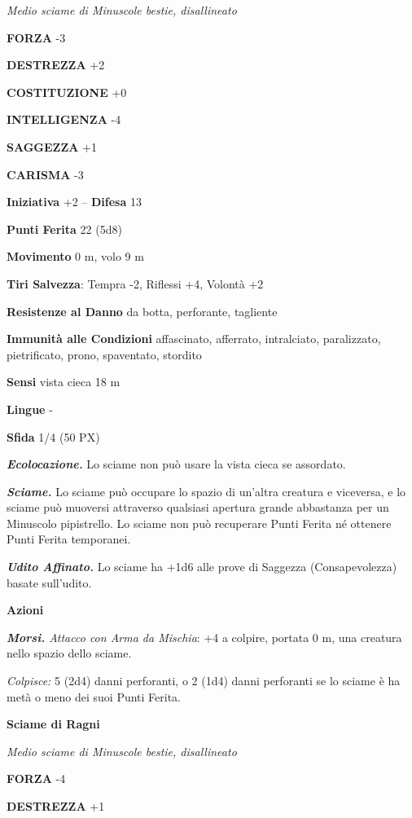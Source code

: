\begin{multicols}{2}
	\textit{Medio sciame di Minuscole bestie, disallineato}

	\textbf{FORZA} -3

	\textbf{DESTREZZA} +2

	\textbf{COSTITUZIONE} +0

	\textbf{INTELLIGENZA} -4

	\textbf{SAGGEZZA} +1

	\textbf{CARISMA} -3

	\textbf{Iniziativa} +2 -- \textbf{Difesa} 13

	\textbf{Punti Ferita} 22 (5d8)

	\textbf{Movimento} 0 m, volo 9 m

	\textbf{Tiri Salvezza}: Tempra -2, Riflessi +4, Volontà +2

	\textbf{Resistenze al Danno} da botta, perforante, tagliente

	\textbf{Immunità alle Condizioni} affascinato, afferrato, intralciato, paralizzato, pietrificato, prono, spaventato, stordito

	\textbf{Sensi} vista cieca 18 m

	\textbf{Lingue} -

	\textbf{Sfida} 1/4 (50 PX)

	\textit{\textbf{Ecolocazione.}} Lo sciame non può usare la vista cieca se assordato.

	\textit{\textbf{Sciame.}} Lo sciame può occupare lo spazio di un'altra creatura e viceversa, e lo sciame può muoversi attraverso qualsiasi apertura grande abbastanza per un Minuscolo pipistrello. Lo sciame non può recuperare Punti Ferita né ottenere Punti Ferita temporanei.

	\textit{\textbf{Udito Affinato.}} Lo sciame ha +1d6 alle prove di Saggezza (Consapevolezza) basate sull'udito.

	\textbf{Azioni}

	\textit{\textbf{Morsi.} Attacco con Arma da Mischia}: +4 a colpire, portata 0 m, una creatura nello spazio dello sciame.

	\textit{Colpisce:} 5 (2d4) danni perforanti, o 2 (1d4) danni perforanti se lo sciame è ha metà o meno dei suoi Punti Ferita.

	\medskip\textbf{Sciame di Ragni}

	\textit{Medio sciame di Minuscole bestie, disallineato}

	\textbf{FORZA} -4

	\textbf{DESTREZZA} +1


\end{multicols}
